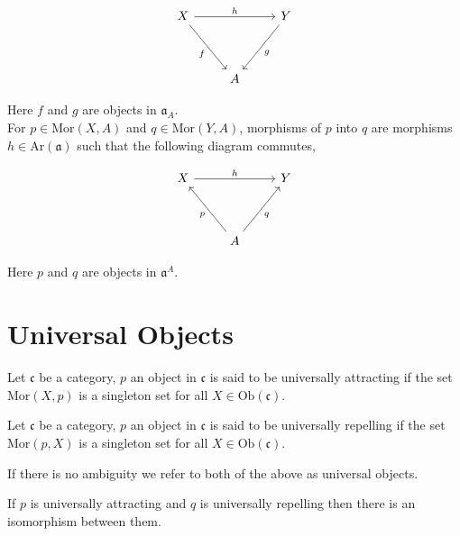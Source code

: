 \documentclass[11pt,a4paper]{colorart}
\def\mab{\mathfrak}
\begin{document}
\[\begin{tikzcd}
	X && Y \\
	\\
	& A
	\arrow["f"', from=1-1, to=3-2]
	\arrow["g", from=1-3, to=3-2]
	\arrow["h", from=1-1, to=1-3]
\end{tikzcd}\]

Here $f$ and $g$ are objects in $\mab{a}_A$.\\

For $p\in \text{Mor}(X,A)$ and $q\in \text{Mor}(Y,A)$, morphisms of $p$ into $q$ are morphisms $h \in \text{Ar}(\mab{a})$ such that the following diagram commutes,

\[\begin{tikzcd}
	X && Y \\
	\\
	& A
	\arrow["h", from=1-1, to=1-3]
	\arrow["p", from=3-2, to=1-1]
	\arrow["q"', from=3-2, to=1-3]
\end{tikzcd}\]

Here $p$ and $q$ are objects in $\mab{a}^A$.\\

\section{Universal Objects}

\begin{definition}
	Let $\mab{c}$ be a category, $p$ an object in $\mab{c}$ is said to be universally attracting if the set Mor$(X,p)$ is a singleton set for all $X \in \text{Ob}(\mab{c})$. 
\end{definition}

\begin{definition}
	Let $\mab{c}$ be a category, $p$ an object in $\mab{c}$ is said to be universally repelling if the set Mor$(p,X)$ is a singleton set for all $X \in \text{Ob}(\mab{c})$. 
\end{definition}

If there is no ambiguity we refer to both of the above as universal objects.

\begin{proposition}[]
	If $p$ is universally attracting and $q$ is universally repelling then there is an isomorphism between them.
\end{proposition}
\end{document}
